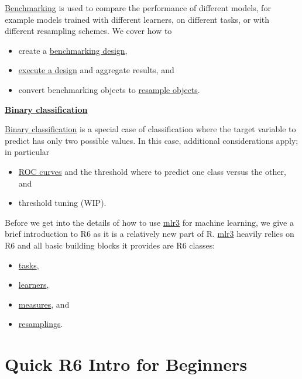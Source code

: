 \documentclass[
  11pt,
  parskip=half,
  DIV=calc,
  BCOR=10mm,
  x11names]{scrbook}
\providecommand{\tightlist}{%
  \setlength{\itemsep}{0pt}\setlength{\parskip}{0pt}}
\begin{document}
\protect\hyperlink{benchmarking}{Benchmarking} is used to compare the performance of different models, for example models trained with different learners, on different tasks, or with different resampling schemes.
We cover how to

\begin{itemize}
\tightlist
\item
  create a \protect\hyperlink{bm-design}{benchmarking design},
\item
  \protect\hyperlink{bm-exec}{execute a design} and aggregate results, and
\item
  convert benchmarking objects to \protect\hyperlink{bm-resamp}{resample objects}.
\end{itemize}

\protect\hyperlink{binary}{\textbf{Binary classification}}

\protect\hyperlink{binary}{Binary classification} is a special case of classification where the target variable to predict has only two possible values.
In this case, additional considerations apply; in particular

\begin{itemize}
\tightlist
\item
  \protect\hyperlink{binary-roc}{ROC curves} and the threshold where to predict one class versus the other, and
\item
  threshold tuning (WIP).
\end{itemize}

Before we get into the details of how to use \href{https://mlr3.mlr-org.com}{mlr3} for machine learning, we give a brief introduction to R6 as it is a relatively new part of R.
\href{https://mlr3.mlr-org.com}{mlr3} heavily relies on R6 and all basic building blocks it provides are R6 classes:

\begin{itemize}
\tightlist
\item
  \protect\hyperlink{tasks}{tasks},
\item
  \protect\hyperlink{learners}{learners},
\item
  \protect\hyperlink{measures}{measures}, and
\item
  \protect\hyperlink{resampling}{resamplings}.
\end{itemize}

\hypertarget{r6}{%
\section{Quick R6 Intro for Beginners}\label{r6}}
\end{document}
